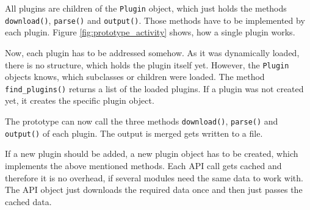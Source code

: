All plugins are children of the \texttt{Plugin} object, which just holds the
methods \texttt{download()}, \texttt{parse()} and \texttt{output()}. Those
methods have to be implemented by each plugin. Figure
\ref{fig:prototype_activity} shows, how a single plugin works.

Now, each plugin has to be addressed somehow. As it was dynamically loaded,
there is no structure, which holds the plugin itself yet. However, the
\texttt{Plugin} objects knows, which subclasses or children were loaded. The
method \texttt{find\_plugins()} returns a list of the loaded plugins. If a
plugin was not created yet, it creates the specific plugin object.

The prototype can now call the three methods \texttt{download()},
\texttt{parse()} and \texttt{output()} of each plugin. The output is merged
gets written to a file.

If a new plugin should be added, a new plugin object has to be created, which
implements the above mentioned methods. Each API call gets cached and therefore
it is no overhead, if several modules need the same data to work with. The API
object just downloads the required data once and then just passes the cached
data.


